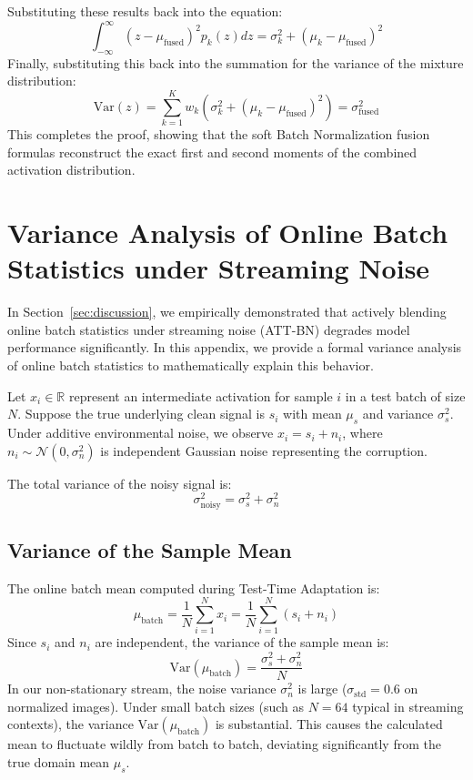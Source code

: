 \documentclass{article}
\theoremstyle{plain}
\theoremstyle{definition}
\theoremstyle{remark}
\begin{document}
Substituting these results back into the equation:
\begin{equation}
    \int_{-\infty}^{\infty} (z - \mu_{\text{fused}})^2 p_k(z) dz = \sigma^2_k + (\mu_k - \mu_{\text{fused}})^2
\end{equation}
Finally, substituting this back into the summation for the variance of the mixture distribution:
\begin{equation}
    \text{Var}(z) = \sum_{k=1}^K w_k \left( \sigma^2_k + (\mu_k - \mu_{\text{fused}})^2 \right) = \sigma^2_{\text{fused}}
\end{equation}
This completes the proof, showing that the soft Batch Normalization fusion formulas reconstruct the exact first and second moments of the combined activation distribution.

\section{Variance Analysis of Online Batch Statistics under Streaming Noise}
\label{sec:variance_analysis}
In Section~\ref{sec:discussion}, we empirically demonstrated that actively blending online batch statistics under streaming noise (ATT-BN) degrades model performance significantly. In this appendix, we provide a formal variance analysis of online batch statistics to mathematically explain this behavior.

Let $x_i \in \mathbb{R}$ represent an intermediate activation for sample $i$ in a test batch of size $N$. Suppose the true underlying clean signal is $s_i$ with mean $\mu_s$ and variance $\sigma^2_s$. Under additive environmental noise, we observe $x_i = s_i + n_i$, where $n_i \sim \mathcal{N}(0, \sigma^2_n)$ is independent Gaussian noise representing the corruption.

The total variance of the noisy signal is:
\begin{equation}
    \sigma^2_{\text{noisy}} = \sigma^2_s + \sigma^2_n
\end{equation}

\subsection{Variance of the Sample Mean}
The online batch mean computed during Test-Time Adaptation is:
\begin{equation}
    \mu_{\text{batch}} = \frac{1}{N} \sum_{i=1}^N x_i = \frac{1}{N} \sum_{i=1}^N (s_i + n_i)
\end{equation}
Since $s_i$ and $n_i$ are independent, the variance of the sample mean is:
\begin{equation}
    \text{Var}(\mu_{\text{batch}}) = \frac{\sigma^2_s + \sigma^2_n}{N}
\end{equation}
In our non-stationary stream, the noise variance $\sigma^2_n$ is large ($\sigma_{\text{std}} = 0.6$ on normalized images). Under small batch sizes (such as $N=64$ typical in streaming contexts), the variance $\text{Var}(\mu_{\text{batch}})$ is substantial. This causes the calculated mean to fluctuate wildly from batch to batch, deviating significantly from the true domain mean $\mu_s$.
\end{document}
